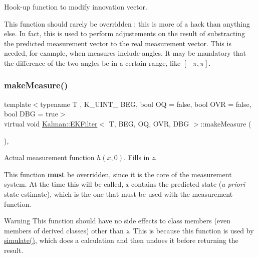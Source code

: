 Hook-\/up function to modify innovation vector. 

This function should rarely be overridden ; this is more of a hack than anything else. In fact, this is used to perform adjustements on the result of substracting the predicted measurement vector to the real measurement vector. This is needed, for example, when measures include angles. It may be mandatory that the difference of the two angles be in a certain range, like $ [-\pi, \pi] $. \mbox{\label{classKalman_1_1EKFilter_aac9f6d80e5ec9e6ea2ccf045cb682df8}} 
\subsubsection{\texorpdfstring{make\+Measure()}{makeMeasure()}}
{\footnotesize\ttfamily template$<$typename T , K\+\_\+\+U\+I\+N\+T\+\_ B\+EG, bool OQ = false, bool O\+VR = false, bool D\+BG = true$>$ \\
virtual void \mbox{\hyperlink{classKalman_1_1EKFilter}{Kalman\+::\+E\+K\+Filter}}$<$ T, B\+EG, OQ, O\+VR, D\+BG $>$\+::make\+Measure (\begin{DoxyParamCaption}{ }\end{DoxyParamCaption})\hspace{0.3cm}{\ttfamily [protected]}, {}}



Actual measurement function $ h(x, 0) $. Fills in {\itshape z}. 

This function {\bfseries must} be overridden, since it is the core of the measurement system. At the time this will be called, {\itshape x} contains the predicted state ({\itshape a priori} state estimate), which is the one that must be used with the measurement function. \begin{DoxyWarning}{Warning}
This function should have no side effects to class members (even members of derived classes) other than {\itshape z}. This is because this function is used by {\ttfamily \mbox{\hyperlink{classKalman_1_1EKFilter_ae111e647e38f64bed354c85ff8f5c3ad}{simulate()}}}, which does a calculation and then undoes it before returning the result. 
\end{DoxyWarning}
\mbox{\label{classKalman_1_1EKFilter_a778232d397d981c08b3ca23ea800aa6a}} 
